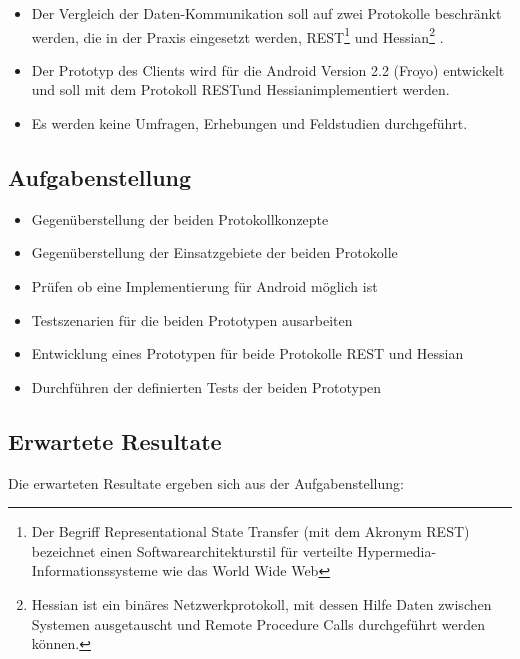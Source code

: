 \documentclass[listof=totocnumbered, bibliography=totocnumbered]{scrreprt}
\begin{document}
  \begin{itemize}
    \item Der Vergleich der Daten-Kommunikation soll auf zwei Protokolle
          beschränkt werden, die in der Praxis eingesetzt werden,
          \ac{REST}\footnote[1]{
            Der Begriff Representational State Transfer (mit dem Akronym
            REST) bezeichnet einen Softwarearchitekturstil für verteilte
            Hypermedia-Informationssysteme wie das World Wide Web}
          und Hessian\footnote[2]{
            Hessian ist ein binäres Netzwerkprotokoll, mit dessen Hilfe
            Daten zwischen Systemen ausgetauscht und Remote Procedure Calls
            durchgeführt werden können.}
          .
    \item Der Prototyp des Clients wird für die Android Version 2.2 (Froyo)
          entwickelt und soll mit dem Protokoll \ac{REST}\footnotemark[1] und
          Hessian\footnotemark[2] implementiert werden.
    \item Es werden keine Umfragen, Erhebungen und Feldstudien
          durchgeführt.
  \end{itemize}
  
  \newpage
  
  \subsection{Aufgabenstellung}
  
  \begin{itemize}
    \item Gegenüberstellung der beiden Protokollkonzepte
    \item Gegenüberstellung der Einsatzgebiete der beiden Protokolle
    \item Prüfen ob eine Implementierung für Android möglich ist
    \item Testszenarien für die beiden Prototypen ausarbeiten
    \item Entwicklung eines Prototypen für beide Protokolle \ac{REST} und
          Hessian
    \item Durchführen der definierten Tests der beiden Prototypen
  \end{itemize}
  
  \subsection{Erwartete Resultate}
  Die erwarteten Resultate ergeben sich aus der Aufgabenstellung:
  
\end{document}
